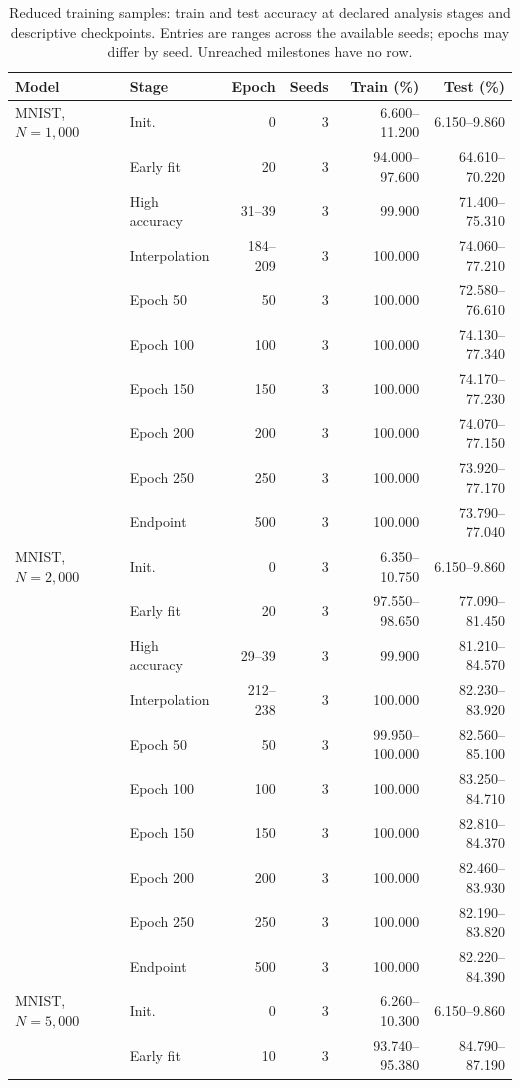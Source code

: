 \FloatBarrier
\begin{table}[!htbp]\centering
\caption{Reduced training samples: train and test accuracy at declared analysis stages and descriptive checkpoints. Entries are ranges across the available seeds; epochs may differ by seed. Unreached milestones have no row.}\label{tab:perf-4-0}
\small\setlength{\tabcolsep}{4pt}
\begin{tabular}{llrrrr}\toprule
Model & Stage & Epoch & Seeds & Train (\%) & Test (\%)\\\midrule
MNIST, $N=1{,}000$ & Init. & 0 & 3 & 6.600--11.200 & 6.150--9.860\\
 & Early fit & 20 & 3 & 94.000--97.600 & 64.610--70.220\\
 & High accuracy & 31--39 & 3 & 99.900 & 71.400--75.310\\
 & Interpolation & 184--209 & 3 & 100.000 & 74.060--77.210\\
 & Epoch 50 & 50 & 3 & 100.000 & 72.580--76.610\\
 & Epoch 100 & 100 & 3 & 100.000 & 74.130--77.340\\
 & Epoch 150 & 150 & 3 & 100.000 & 74.170--77.230\\
 & Epoch 200 & 200 & 3 & 100.000 & 74.070--77.150\\
 & Epoch 250 & 250 & 3 & 100.000 & 73.920--77.170\\
 & Endpoint & 500 & 3 & 100.000 & 73.790--77.040\\
\midrule
MNIST, $N=2{,}000$ & Init. & 0 & 3 & 6.350--10.750 & 6.150--9.860\\
 & Early fit & 20 & 3 & 97.550--98.650 & 77.090--81.450\\
 & High accuracy & 29--39 & 3 & 99.900 & 81.210--84.570\\
 & Interpolation & 212--238 & 3 & 100.000 & 82.230--83.920\\
 & Epoch 50 & 50 & 3 & 99.950--100.000 & 82.560--85.100\\
 & Epoch 100 & 100 & 3 & 100.000 & 83.250--84.710\\
 & Epoch 150 & 150 & 3 & 100.000 & 82.810--84.370\\
 & Epoch 200 & 200 & 3 & 100.000 & 82.460--83.930\\
 & Epoch 250 & 250 & 3 & 100.000 & 82.190--83.820\\
 & Endpoint & 500 & 3 & 100.000 & 82.220--84.390\\
\midrule
MNIST, $N=5{,}000$ & Init. & 0 & 3 & 6.260--10.300 & 6.150--9.860\\
 & Early fit & 10 & 3 & 93.740--95.380 & 84.790--87.190\\

\end{tabular}
\end{table}
